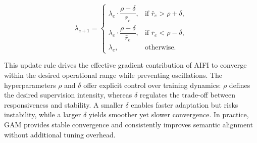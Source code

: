\begin{equation}
    \lambda_{e+1} =
    \begin{cases}
    \lambda_e \cdot \dfrac{\rho - \delta}{\bar{r}_e}, & \text{if } \bar{r}_e > \rho + \delta, \\[8pt]
    \lambda_e \cdot \dfrac{\rho + \delta}{\bar{r}_e}, & \text{if } \bar{r}_e < \rho - \delta, \\[8pt]
    \lambda_e, & \text{otherwise.}
    \end{cases}
    \label{eq:update_method}
\end{equation}

This update rule drives the effective gradient contribution of AIFI to converge within the desired operational range while preventing oscillations.
The hyperparameters $\rho$ and $\delta$ offer explicit control over training dynamics: $\rho$ defines the desired supervision intensity, whereas $\delta$ regulates the trade-off between responsiveness and stability.
A smaller $\delta$ enables faster adaptation but risks instability, while a larger $\delta$ yields smoother yet slower convergence.
In practice, GAM provides stable convergence and consistently improves semantic alignment without additional tuning overhead.

